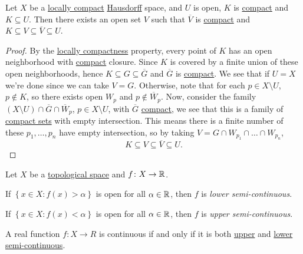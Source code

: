 \begin{theorem}
	Let \(X\) be a \hyperref[def:locally-compact]{locally compact} \hyperref[def:Hausdorff]{Hausdorff} space, and \(U\) is open, \(K\) is \hyperref[def:compact]{compact} and \(K \subseteq U\). Then there exists an open set \(V\) such that \(\overline{V} \) is \hyperref[def:compact]{compact} and \(K \subseteq V \subseteq \overline{V} \subseteq U\).
\end{theorem}
\begin{proof}
	By the \hyperref[def:locally-compact]{locally compactness} property, every point of \(K\) has an open neighborhood with \hyperref[def:compact]{compact} closure. Since \(K\) is covered by a finite union of these open neighborhoods, hence \(K \subseteq G \subseteq \overline{G} \) and \(\overline{G} \) is \hyperref[def:compact]{compact}. We see that if \(U = X\) we're done since we can take \(V = G\). Otherwise, note that for each \(p\in X \setminus U\), \(p\notin K\), so there exists open \(W_p\) and \(p \notin \overline{W} _p\). Now, consider the family \((X \setminus U) \cap \overline{G} \cap \overline{W} _p\), \(p\in X\setminus U\), with \(\overline{G} \) \hyperref[def:compact]{compact}, we see that this is a family of \hyperref[def:compact]{compact sets} with empty intersection. This means there is a finite number of these \(p_1, \ldots  , p_n\) have empty intersection, so by taking \(V = G \cap W_{p_1} \cap \ldots  \cap W_{p_n}\),
	\[
		K \subseteq V \subseteq \overline{V} \subseteq U.
	\]
\end{proof}

\begin{definition*}
	Let \(X\) be a \hyperref[def:topological-space]{topological space} and \(f\colon X \to \mathbb{\MakeUppercase{r}} \).
	\begin{definition}\label{def:lower-semi-continuous}
		If \(\left\{ x\in X\colon f(x) > \alpha  \right\} \) is open for all \(\alpha \in \mathbb{\MakeUppercase{r}} \), then \(f\) is \emph{lower semi-continuous}.
	\end{definition}
	\begin{definition}\label{def:upper-semi-continuous}
		If \(\left\{ x\in X\colon f(x) < \alpha  \right\} \) is open for all \(\alpha \in \mathbb{\MakeUppercase{r}} \), then \(f\) is \emph{upper semi-continuous}.
	\end{definition}
\end{definition*}

\begin{remark}
	A real function \(f\colon X \to R\) is continuous if and only if it is both \hyperref[def:upper-semi-continuous]{upper} and \hyperref[def:lower-semi-continuous]{lower semi-continuous}.
\end{remark}


